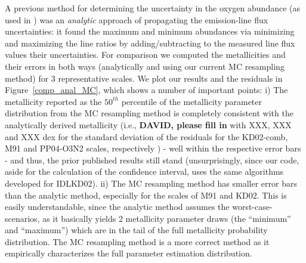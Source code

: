 \documentclass{emulateapj}
\begin{document}
A previous method for determining the uncertainty in the oxygen abundance (as used in \citealt{modjaz08_Z,kewley10,rupke10,modjaz11}) was an \emph{analytic} approach of propagating the emission-line flux uncertainties: it found the maximum and minimum abundances via minimizing and maximizing the line ratios by adding/subtracting to the measured line flux values their uncertainties. For comparison we computed the metallicities and their errors in both ways (analytically and using our current MC resampling method) for 3 representative scales. We plot our results and the residuals in Figure~\ref{comp_anal_MC}, which shows a number of important points: i) The metallicity reported as the $50^{th}$ percentile of the metallicity parameter distribution from the MC resampling method is completely consistent with the analytically derived metallicity (i.e., \textbf{DAVID, please fill in} with XXX, XXX and XXX dex for the standard deviation of the residuals for the KD02-comb, M91 and PP04-O3N2 scales, respectively ) -  well within the respective error bars - and thus, the prior published results still stand (unsurprisingly, since our code, aside for the calculation of the confidence interval, uses the same algorithms developed for IDLKD02).
 ii) The MC resampling method has smaller error bars than the analytic method, especially for the scales of M91 and KD02. This is easily understandable, since the analytic method assumes the worst-case-scenarios, as it basically yields 2 metallicity parameter draws (the ``minimum'' and ``maximum'') which are in the tail of the full metallicity probability distribution. The MC resampling method is a more correct method as it empirically characterizes the full parameter estimation distribution.
\end{document}
